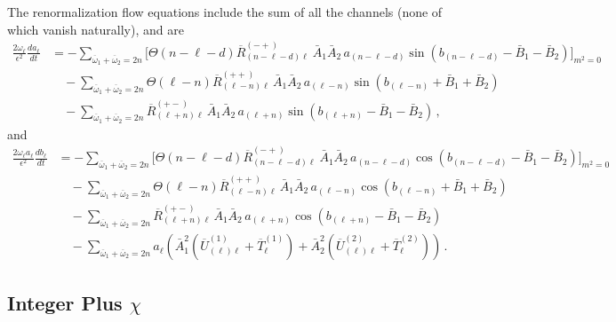 \documentclass[letterpaper,11pt]{article}
\newcommand{\ol}{\omega_\ell}
\newcommand{\oone}{\overline{\omega}_1}
\newcommand{\otwo}{\overline{\omega}_2}
\begin{document}
The renormalization flow equations include the sum of all the channels (none of which vanish naturally), and are
\begin{align}
\label{atoi RN 1}	
\frac{2 \ol}{\epsilon^2} \frac{d a_\ell}{d t} &= - \!\!\!\! \sum_{\oone + \otwo = 2n}\bigg[ \Theta\left( n - \ell - d \right) \overline{R}^{(-+)}_{(n - \ell - d) \ell} \ \bar A_1 \bar A_2 \, a_{(n - \ell - d)} \sin \left( b_{(n - \ell - d)} - \bar B_1 - \bar B_2 \right) \bigg]_{m^2 = 0}  \nonumber \\ 
%
& \quad - \!\!\!\! \sum_{\oone + \otwo = 2n} \!\!\!\! \Theta \left( \ell - n \right)  \overline{R}^{(++)}_{(\ell - n)\ell} \, \bar A_1 \bar A_2 \, a_{(\ell - n)} \sin \left( b_{(\ell - n)} + \bar B_1 + \bar B_2 \right) \nonumber \\
%
& \quad  - \!\!\!\! \sum_{\oone + \otwo = 2n} \!\!\!\! \overline{R}^{(+-)}_{(\ell + n) \ell} \, \bar A_1 \bar A_2 \, a_{(\ell + n)} \sin \left( b_{(\ell + n)} - \bar B_1 - \bar B_2 \right) \, ,
\end{align}
and
\begin{align}
\label{atoi RN 2}	
\frac{2 \ol a_\ell}{\epsilon^2} \frac{d b_\ell}{d t} &= - \!\!\!\! \sum_{\oone + \otwo = 2n}\bigg[ \Theta\left( n - \ell - d \right) \overline{R}^{(-+)}_{(n - \ell - d) \ell} \ \bar A_1 \bar A_2 \, a_{(n - \ell - d)} \cos \left( b_{(n - \ell - d)} - \bar B_1 - \bar B_2 \right) \bigg]_{m^2 = 0}  \nonumber \\ 
%
& \quad - \!\!\!\! \sum_{\oone + \otwo = 2n} \!\!\!\! \Theta \left( \ell - n \right)  \overline{R}^{(++)}_{(\ell - n)\ell} \, \bar A_1 \bar A_2 \, a_{(\ell - n)} \cos \left( b_{(\ell - n)} + \bar B_1 + \bar B_2 \right) \nonumber \\
%
& \quad  - \!\!\!\! \sum_{\oone + \otwo = 2n} \!\!\!\! \overline{R}^{(+-)}_{(\ell + n) \ell} \, \bar A_1 \bar A_2 \, a_{(\ell + n)} \cos \left( b_{(\ell + n)} - \bar B_1 - \bar B_2 \right) \nonumber \\
%
& \quad - \!\!\!\! \sum_{\oone + \otwo = 2n} \!\!\!\! a_\ell \left( \bar A_1^2 ( \overline{U}^{(1)}_{(\ell)\ell} + \overline{T}^{(1)}_\ell) + \bar A_2^2 (\overline{U}^{(2)}_{(\ell)\ell} + \overline{T}^{(2)}_\ell) \right) \, .
\end{align}


\subsection{Integer Plus $\chi$}
\label{ssec: intpluschi}
\end{document}
